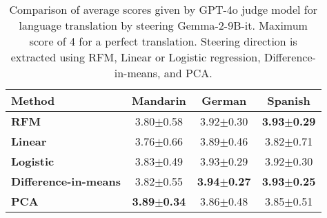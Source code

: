 \begin{table}[h]
\centering
\begin{tabular}{@{}lccc@{}}
\toprule
\textbf{Method}         & \textbf{Mandarin}          & \textbf{German}           & \textbf{Spanish}          \\ \midrule
\textbf{RFM}            & 3.80$\pm$0.58          & 3.92$\pm$0.30           & \textbf{3.93$\pm$0.29}           \\ 
\textbf{Linear}         & 3.76$\pm$0.66          & 3.89$\pm$0.46           & 3.82$\pm$0.71           \\
\textbf{Logistic}       & 3.83$\pm$0.49          & 3.93$\pm$0.29           & 3.92$\pm$0.30           \\
\textbf{Difference-in-means}& 3.82$\pm$0.55          & \textbf{3.94$\pm$0.27}           & \textbf{3.93$\pm$0.25}           \\
\textbf{PCA}            & \textbf{3.89$\pm$0.34}          & 3.86$\pm$0.48           & 3.85$\pm$0.51           \\
\bottomrule
\end{tabular}
\caption{Comparison of average scores given by GPT-4o judge model for language translation by steering Gemma-2-9B-it. Maximum score of 4 for a perfect translation. Steering direction is extracted using RFM, Linear or Logistic regression, Difference-in-means, and PCA.}
\label{fig: language steering results, gemmma}
\end{table}